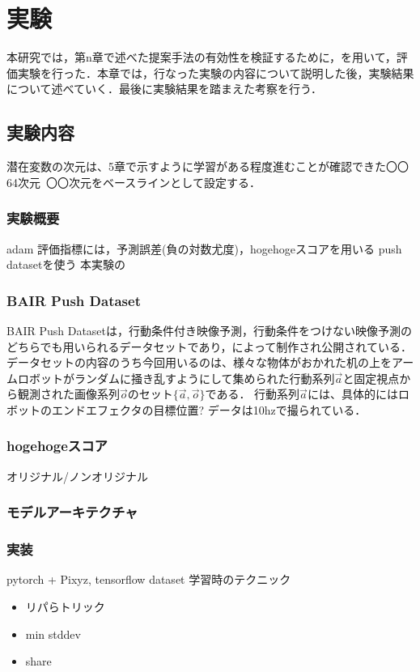 \chapter{実験}
\label{chap:experiment}
本研究では，第n章で述べた提案手法の有効性を検証するために，を用いて，評価実験を行った．本章では，行なった実験の内容について説明した後，実験結果について述べていく．最後に実験結果を踏まえた考察を行う．

\section{実験内容}
潜在変数の次元は、5章で示すように学習がある程度進むことが確認できた〇〇64次元~〇〇次元をベースラインとして設定する．

\subsection{実験概要}
adam
評価指標には，予測誤差(負の対数尤度)，hogehogeスコアを用いる
push datasetを使う
本実験の

\subsection{BAIR Push Dataset}
BAIR Push Datasetは，行動条件付き映像予測，行動条件をつけない映像予測のどちらでも用いられるデータセットであり，によって制作され公開されている．
データセットの内容のうち今回用いるのは、様々な物体がおかれた机の上をアームロボットがランダムに掻き乱すようにして集められた行動系列$\vec{a}$と固定視点から観測された画像系列$\vec{o}$のセット$\{\vec{a}, \vec{o}\}$である．
行動系列$\vec{a}$には、具体的にはロボットのエンドエフェクタの目標位置?
データは10hzで撮られている．

\subsection{hogehogeスコア}
オリジナル/ノンオリジナル
\subsection{モデルアーキテクチャ}
\subsection{}
\subsection{実装}
pytorch + Pixyz, tensorflow dataset
学習時のテクニック
\begin{itemize}
    \item リパらトリック
    \item min stddev
    \item share
\end{itemize}

